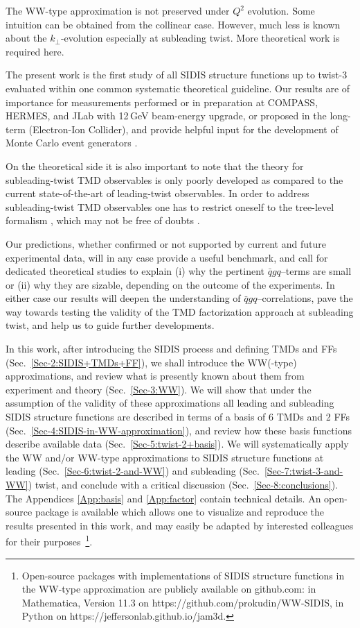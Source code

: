 \documentclass[a4paper,11pt]{article}
\begin{document}
The WW-type approximation is not preserved under $Q^2$ evolution.
Some intuition can be obtained from the collinear case. However,
much less is known about the $k_\perp$-evolution especially at 
subleading twist. More theoretical work is required here.

The present work is the first 
study of all SIDIS structure functions up to twist-3 evaluated within one
common systematic theoretical guideline.
Our results are of importance for measurements
performed or in preparation at COMPASS, HERMES, and JLab with
12$\,$GeV beam-energy upgrade, or proposed in the long-term
(Electron-Ion Collider), and provide helpful input for the
development of Monte Carlo event generators \cite{Avakian:2015vha}.

On the theoretical side it is also important to note that the
theory for subleading-twist TMD observables is only poorly developed
as compared to the current state-of-the-art of leading-twist observables.
In order to address subleading-twist TMD observables one has
to restrict oneself to the tree-level formalism
\cite{Kotzinian:1994dv,Mulders:1995dh,Boer:1997nt,Goeke:2005hb,
Bacchetta:2006tn}, which may not be free of doubts
\cite{Metz:2004je,Gamberg:2006ru}.

Our predictions, whether confirmed or not supported by current and
future experimental data, will in any case provide a useful benchmark,
and call for dedicated theoretical studies to explain (i) why the
pertinent $\bar{q}gq$--terms are small or (ii) why they are sizable,
depending on the outcome of the experiments.
In either case our results will deepen the understanding of
$\bar{q}gq$--correlations, pave the
way towards testing the validity of the TMD factorization approach
at subleading twist, and help us to guide further developments.

In this work, after introducing the SIDIS process and defining TMDs and
FFs (Sec.~\ref{Sec-2:SIDIS+TMDs+FF}), we shall introduce the WW(-type)
approximations, and review what is presently known about them
from experiment and theory (Sec.~\ref{Sec-3:WW}).
We will show that under the assumption of the validity of these approximations
all leading and subleading SIDIS structure functions are described in terms of
a basis of 6 TMDs and 2 FFs (Sec.~\ref{Sec-4:SIDIS-in-WW-approximation}),
and review how these basis functions describe available data
(Sec.~\ref{Sec-5:twist-2+basis}).
We will systematically apply the WW and/or WW-type approximations
to SIDIS structure functions at leading (Sec.~\ref{Sec-6:twist-2-and-WW})
and subleading (Sec.~\ref{Sec-7:twist-3-and-WW}) twist, and
conclude with a critical discussion (Sec.~\ref{Sec-8:conclusions}).
The Appendices \ref{App:basis} and \ref{App:factor} contain
technical details.
An open-source package is available which allows one to visualize 
	and reproduce the results presented in this work, and may easily 
	be adapted by interested colleagues for their purposes~\footnote{Open-source packages with implementations of SIDIS structure functions
in the WW-type approximation are publicly available on github.com: in
Mathematica, Version 11.3 on https://github.com/prokudin/WW-SIDIS, in Python on https://jeffersonlab.github.io/jam3d.}.
\end{document}
